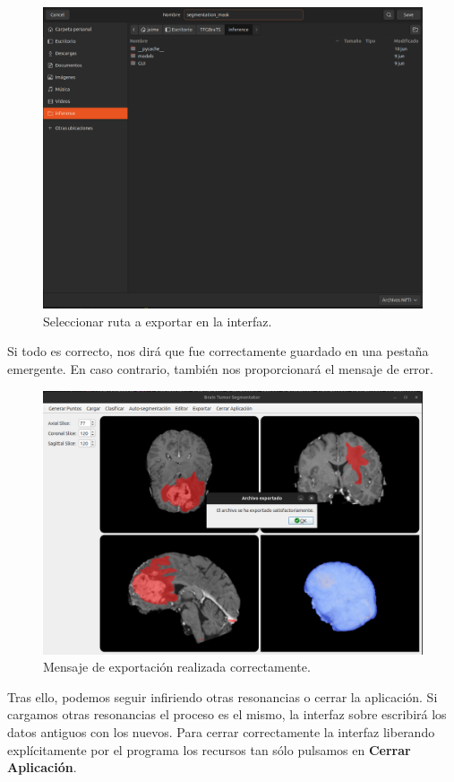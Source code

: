\begin{figure}[H]
	\centering
	\includegraphics[width=0.7\linewidth]{imagenes/interfaz_seleccruta.png}
	\caption{Seleccionar ruta a exportar en la interfaz.}
\end{figure}

Si todo es correcto, nos dirá que fue correctamente guardado en una pestaña emergente. En caso contrario, también nos proporcionará el mensaje de error.

\begin{figure}[H]
	\centering
	\includegraphics[width=0.7\linewidth]{imagenes/interfaz_mensaje.png}
	\caption{ Mensaje de exportación realizada correctamente.}
\end{figure}

Tras ello, podemos seguir infiriendo otras resonancias o cerrar la aplicación. Si cargamos otras resonancias el proceso es el mismo, la interfaz sobre escribirá los datos antiguos con los nuevos. Para cerrar correctamente la interfaz liberando explícitamente por el programa los recursos tan sólo pulsamos en \textbf{Cerrar Aplicación}.

